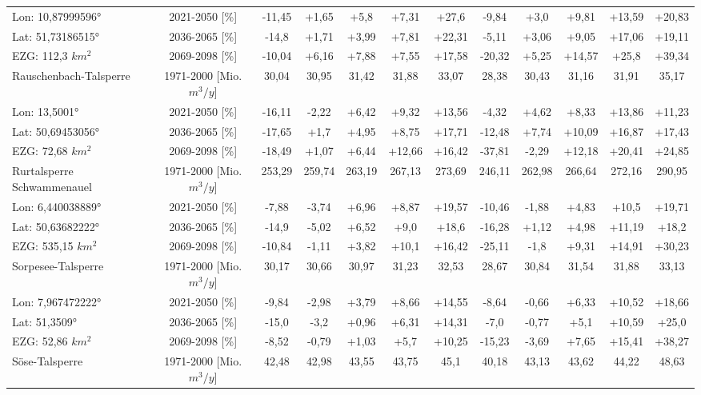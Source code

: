 \begin{longtable}{@{\extracolsep{\fill}}lc|ccccc||ccccc}
\cline{2-12} 
Lon: 10,87999596° & 2021-2050 [\%]  & -11,45 & +1,65 & +5,8 & +7,31 & +27,6 & -9,84 & +3,0 & +9,81 & +13,59 & +20,83\\ 
Lat: 51,73186515° & 2036-2065 [\%]  & -14,8 & +1,71 & +3,99 & +7,81 & +22,31 & -5,11 & +3,06 & +9,05 & +17,06 & +19,11\\ 
EZG: 112,3 $km^2$ & 2069-2098 [\%]  & -10,04 & +6,16 & +7,88 & +7,55 & +17,58 & -20,32 & +5,25 & +14,57 & +25,8 & +39,34\\ 
\hline 
Rauschenbach-Talsperre & 1971-2000 [Mio. $m^3/y$]  & 30,04 & 30,95 & 31,42 & 31,88 & 33,07 & 28,38 & 30,43 & 31,16 & 31,91 & 35,17\\ 
\cline{2-12} 
Lon: 13,5001° & 2021-2050 [\%]  & -16,11 & -2,22 & +6,42 & +9,32 & +13,56 & -4,32 & +4,62 & +8,33 & +13,86 & +11,23\\ 
Lat: 50,69453056° & 2036-2065 [\%]  & -17,65 & +1,7 & +4,95 & +8,75 & +17,71 & -12,48 & +7,74 & +10,09 & +16,87 & +17,43\\ 
EZG: 72,68 $km^2$ & 2069-2098 [\%]  & -18,49 & +1,07 & +6,44 & +12,66 & +16,42 & -37,81 & -2,29 & +12,18 & +20,41 & +24,85\\ 
\hline 
Rurtalsperre Schwammenauel & 1971-2000 [Mio. $m^3/y$]  & 253,29 & 259,74 & 263,19 & 267,13 & 273,69 & 246,11 & 262,98 & 266,64 & 272,16 & 290,95\\ 
\cline{2-12} 
Lon: 6,440038889° & 2021-2050 [\%]  & -7,88 & -3,74 & +6,96 & +8,87 & +19,57 & -10,46 & -1,88 & +4,83 & +10,5 & +19,71\\ 
Lat: 50,63682222° & 2036-2065 [\%]  & -14,9 & -5,02 & +6,52 & +9,0 & +18,6 & -16,28 & +1,12 & +4,98 & +11,19 & +18,2\\ 
EZG: 535,15 $km^2$ & 2069-2098 [\%]  & -10,84 & -1,11 & +3,82 & +10,1 & +16,42 & -25,11 & -1,8 & +9,31 & +14,91 & +30,23\\ 
\hline 
Sorpesee-Talsperre & 1971-2000 [Mio. $m^3/y$]  & 30,17 & 30,66 & 30,97 & 31,23 & 32,53 & 28,67 & 30,84 & 31,54 & 31,88 & 33,13\\ 
\cline{2-12} 
Lon: 7,967472222° & 2021-2050 [\%]  & -9,84 & -2,98 & +3,79 & +8,66 & +14,55 & -8,64 & -0,66 & +6,33 & +10,52 & +18,66\\ 
Lat: 51,3509° & 2036-2065 [\%]  & -15,0 & -3,2 & +0,96 & +6,31 & +14,31 & -7,0 & -0,77 & +5,1 & +10,59 & +25,0\\ 
EZG: 52,86 $km^2$ & 2069-2098 [\%]  & -8,52 & -0,79 & +1,03 & +5,7 & +10,25 & -15,23 & -3,69 & +7,65 & +15,41 & +38,27\\ 
\hline 
Söse-Talsperre & 1971-2000 [Mio. $m^3/y$]  & 42,48 & 42,98 & 43,55 & 43,75 & 45,1 & 40,18 & 43,13 & 43,62 & 44,22 & 48,63\\ 

\end{longtable}
